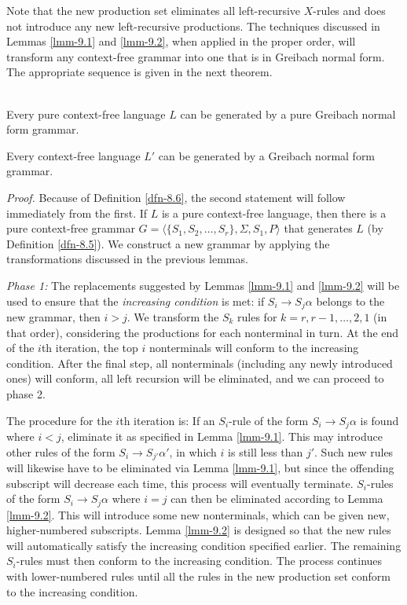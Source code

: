 Note that the new production set eliminates all left-recursive $X$-rules and does not
introduce any new left-recursive productions. The techniques discussed in Lemmas \ref{lmm-9.1}
and \ref{lmm-9.2}, when applied in the proper order, will transform any context-free
grammar into one that is in Greibach normal form. The appropriate sequence is
given in the next theorem.

\begin{thm}\label{thm-9.6}
\ \\
\indent Every pure context-free language $L$ can be generated by a pure Greibach normal
form grammar.

Every context-free language $L'$ can be generated by a Greibach normal form
grammar.

\emph{Proof.} Because of Definition \ref{dfn-8.6}, the second statement will follow
immediately from the first. If $L$ is a pure context-free language, then
there is a pure context-free grammar
$G=\langle\{S_1,S_2,\ldots,S_r\},\Sigma,S_1,P\rangle$ that generates $L$ 
(by Definition \ref{dfn-8.5}). We construct a new grammar by
applying the transformations discussed in the previous lemmas.

\emph{Phase 1:} The replacements suggested by Lemmas \ref{lmm-9.1} and \ref{lmm-9.2} will be used to
ensure that the \emph{increasing condition} is met: if $S_i\rightarrow S_j\alpha$
belongs to the new grammar, then $i>j$. We transform the $S_k$ rules for $k = r,
r-1,\ldots,2,1$ (in that order), considering the productions for each
nonterminal in turn. At the end of the $i$th iteration, the top $i$ nonterminals
will conform to the increasing condition. After the final step, all nonterminals
(including any newly introduced ones) will conform, all left recursion will be
eliminated, and we can proceed to phase 2.

The procedure for the $i$th iteration is: If an $S_i$-rule of the form $S_i
\rightarrow S_j\alpha$ is found where $i<j$, eliminate it as specified in Lemma
\ref{lmm-9.1}. This may introduce other rules of the form $S_i\rightarrow S_{j'}\alpha'$, in
which $i$ is still less than $j'$. Such new rules will likewise have to be
eliminated via Lemma \ref{lmm-9.1}, but since the offending subscript will decrease each
time, this process will eventually terminate. $S_i$-rules of the form $S_i
\rightarrow S_j\alpha$ where $i=j$ can then be eliminated according to Lemma \ref{lmm-9.2}.
This will introduce some new nonterminals, which can be given new,
higher-numbered subscripts. Lemma \ref{lmm-9.2} is designed so that the new rules will
automatically satisfy the increasing condition specified earlier. The remaining
$S_i$-rules must then conform to the increasing condition. The process continues
with lower-numbered rules until all the rules in the new production set conform
to the increasing condition.


\end{thm}
